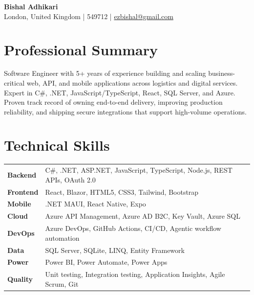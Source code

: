 \documentclass[10pt,a4paper]{article}
\begin{document}
\raggedright

{\LARGE \textbf{Bishal Adhikari}}\\
London, United Kingdom \;| 549712 \;|\; \href{mailto:ezbishal@gmail.com}{ezbishal@gmail.com}

\section*{Professional Summary}
Software Engineer with 5+ years of experience building and scaling business-critical web, API, and mobile applications across logistics and digital services. Expert in C\#, .NET, JavaScript/TypeScript, React, SQL Server, and Azure. Proven track record of owning end-to-end delivery, improving production reliability, and shipping secure integrations that support high-volume operations.

\section*{Technical Skills}
{\renewcommand{\arraystretch}{1.16}
\begin{tabularx}{\linewidth}{>{\bfseries}p{2.25cm}X}
Backend & C\#, .NET, ASP.NET, JavaScript, TypeScript, Node.js, REST APIs, OAuth 2.0 \\
Frontend & React, Blazor, HTML5, CSS3, Tailwind, Bootstrap \\
Mobile & .NET MAUI, React Native, Expo \\
Cloud &  Azure API Management, Azure AD B2C, Key Vault, Azure SQL \\
DevOps & Azure DevOps, GitHub Actions, CI/CD, Agentic workflow automation \\
Data & SQL Server, SQLite, LINQ, Entity Framework \\
Power & Power BI, Power Automate, Power Apps \\
Quality & Unit testing, Integration testing, Application Insights, Agile Scrum, Git \\
\end{tabularx}
}
\end{document}
